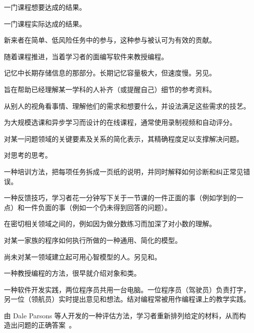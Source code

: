 \begin{description}
 一门课程想要达成的结果。

 一门课程实际达成的结果。

 新来者在简单、低风险任务中的参与，这种参与被认可为有效的贡献。

 随着课程推进，当着学习者的面编写软件来教授编程。

 记忆中长期存储信息的那部分。长期记忆容量极大，但速度慢。另见。

 旨在帮助已经理解某一学科的人补齐（或提醒自己）细节的参考资料。

 从别人的视角看事情、理解他们的需求和想要什么，并设法满足这些需求的技艺。

 为大规模选课和异步学习而设计的在线课程，通常使用录制视频和自动评分。

 对某一问题领域的关键要素及关系的简化表示，其精确程度足以支撑解决问题。

 对思考的思考。

 一种培训方法，把每项任务拆成一页纸的说明，并同时解释如何诊断和纠正常见错误。

 一种反馈技巧，学习者花一分钟写下关于一节课的一件正面的事（例如学到的一点）和一件负面的事（例如一个仍未得到回答的问题）。

 在密切相关领域之间的，例如因为做分数练习而加深了对小数的理解。

 对某一家族的程序如何执行所做的一种通用、简化的模型。

 尚未对某一领域建立起可用心智模型的人。另见和。

 一种教授编程的方法，很早就介绍对象和类。

 一种软件开发实践，两位程序员共用一台电脑。一位程序员（驾驶员）负责打字，另一位（领航员）实时提出意见和想法。结对编程常被用作编程课上的教学实践。

 由 Dale Parsons 等人开发的一种评估方法，学习者重新排列给定的材料，从而构造出问题的正确答案~\cite{Pars2006}。


\end{description}
